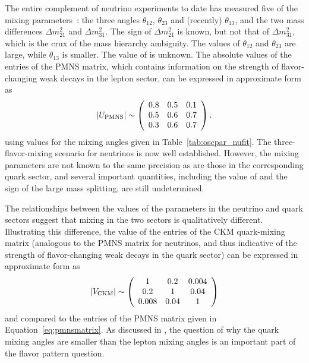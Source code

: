 The entire complement of neutrino experiments to date has measured
five of the mixing parameters~\cite{Gonzalez-Garcia:2014bfa,Capozzi:2013csa,Forero:2014bxa}: the three angles $\theta_{12}$,
$\theta_{23}$ and (recently) $\theta_{13}$, and the two mass differences
$\Delta m^{2}_{21}$ and $\Delta m^{2}_{31}$. The sign of $\Delta
m^{2}_{21}$ is known, but not that of $\Delta m^{2}_{31}$, which 
is the crux of the 
mass hierarchy ambiguity.
The values of $\theta_{12}$ and $\theta_{23}$ are large, while 
$\theta_{13}$ is smaller. The value of \deltacp is unknown.
The absolute values of the entries of the PMNS  matrix, which
contains information on the strength of flavor-changing weak decays in
the lepton sector, can be expressed in approximate form as
\begin{equation}
|U_{\rm PMNS}|\sim \left(\begin{array}{ccc} 0.8 & 0.5 & 0.1 \\ 0.5 & 0.6 & 0.7 \\ 0.3 & 0.6 & 0.7\end{array} \right).
\label{eq:pmnsmatrix}
\end{equation}
using values for the mixing angles given in Table~\ref{tab:oscpar_nufit}.
The three-flavor-mixing scenario for neutrinos is now well
established. However, the mixing parameters are not known to the same precision 
as are those in the
corresponding quark sector, and several important quantities, including
the value of \deltacp and the sign of the large mass splitting, are
still undetermined. 

The relationships between the values of the parameters in the neutrino
and quark sectors suggest that mixing in the two sectors is
qualitatively different. Illustrating this difference, the value of
the entries of the CKM quark-mixing matrix (analogous to the PMNS matrix for
neutrinos, and thus indicative of the strength of flavor-changing weak
decays in the quark sector) can be expressed in approximate form as
\begin{equation}
|V_{\rm CKM}|\sim \left(\begin{array}{ccc} 1 & 0.2 & 0.004\\ 0.2 & 1 & 0.04 \\ 0.008 & 0.04 & 1\end{array} \right)
\label{eq:ckmmatrix}
\end{equation}
and compared  to the entries of the PMNS matrix given in Equation~\ref{eq:pmnsmatrix}.
As discussed in \cite{King:2014nza}, the question of why the quark mixing angles are
smaller than the lepton mixing angles is an important part of the %
flavor pattern question. 

